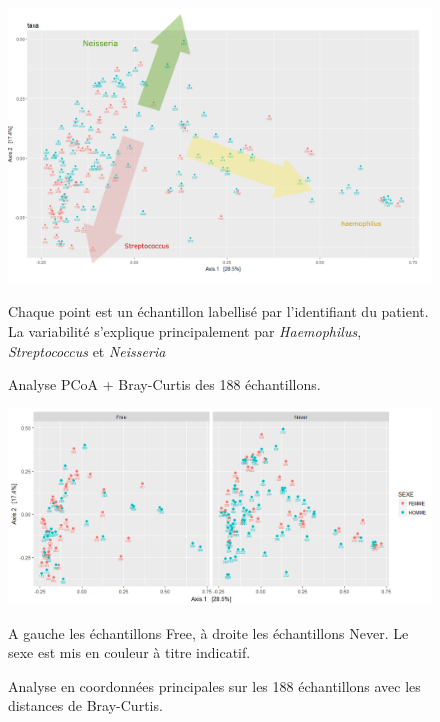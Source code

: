 \documentclass[12pt,a4paper]{article}
\begin{document}
\begin{figure}
\begin{center}
\includegraphics[scale=0.50]{img/Capture.png}\hfill
\end{center}
\caption{Analyse PCoA + Bray-Curtis des 188 échantillons.}
Chaque point est un échantillon labellisé par l'identifiant du patient. La variabilité s'explique principalement par \textit{Haemophilus}, \textit{Streptococcus} et \textit{Neisseria}
\label{ordination2}
\end{figure}


\begin{figure}
\begin{center}
\includegraphics[scale=0.62]{img/oordination_new.png}\hfill
\end{center}
\caption{Analyse en coordonnées principales sur les 188 échantillons avec les distances de Bray-Curtis.}
A gauche les échantillons Free, à droite les échantillons Never. Le sexe est mis en couleur à titre indicatif.
\label{ordination}
\end{figure}
\end{document}

